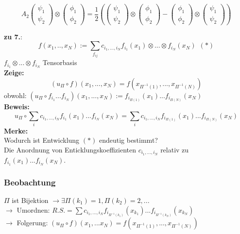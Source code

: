 \documentclass[twoside,a4paper]{scrartcl}
\renewcommand{\1}{\mathds{1}}
\newcommand{\ra}{\rightarrow}
\begin{document}
{$$A_2\begin{pmatrix} \psi_1 \\ \psi_2\end{pmatrix} \otimes \begin{pmatrix} \phi_1 \\ \phi_2\end{pmatrix}=\frac{1}{2} (\begin{pmatrix} \psi_1 \\ \psi_2\end{pmatrix}\otimes \begin{pmatrix} \phi_1 \\ \phi_2\end{pmatrix}-\begin{pmatrix} \phi_1 \\ \phi_2\end{pmatrix}\otimes \begin{pmatrix} \psi_1 \\ \psi_2\end{pmatrix})$$

\textbf{zu 7.}:\\
$$f(x_1,..,x_N):=\sum_{f_{ij}}c_{i_1,...,i_N} f_{i_1}(x_1) \otimes ...\otimes f_{i_N}(x_N) \ \ (*)$$
$f_{i_1} \otimes ...\otimes f_{i_N}$ Tensorbasis\\

\textbf{Zeige:}
$$(u_\Pi\circ f)(x_1,...,x_N)=f(x_{\Pi^{-1}(1)},...,x_{\Pi^{-1}(N)})$$
obwohl: $(u_\Pi\circ f_{i_1}...f_{i_N})(x_1,...,x_N):=f_{i_{\Pi(1)}}(x_1)...f_{i_{\Pi(N)}}(x_N)$\\
\textbf{Beweis:}
$$u_\Pi \circ \sum_{i} c_{i_1,...,i_N}f_{i_1}(x_1)...f_{i_N}(x_N)=\sum_{i} c_{i_1,...,i_N}f_{i_{\Pi(1)}}(x_1)...f_{i_{\Pi(N)}}(x_N) $$
\textbf{Merke:}\\
Wodurch ist Entwicklung $(*)$ endeutig bestimmt?\\
Die Anordnung von Enticklungskoeffizienten $c_{i_1,...,i_N}$ relativ zu $f_{i_1}(x_1)...f_{i_N}(x_N)$.

\subsubsection*{Beobachtung}
$\Pi$ ist Bijektion $\ra \exists \Pi(k_1)=1,\Pi(k_2)=2,...$\\
$\ra$ Umordnen: $R.S.=\sum c_{i_1,...,i_N}f_{i_{\Pi^{-1}(k_1)}}(x_{k_1})...f_{i_{\Pi^{-1}(k_N)}}(x_{k_N})$ \\
$\ra$ Folgerung: $(u_\Pi \circ f)(x_1, ... x_N)=f(x_{\Pi^{-1}(1)},...,x_{\Pi^{-1}(N)}) $
}{}
\end{document}
